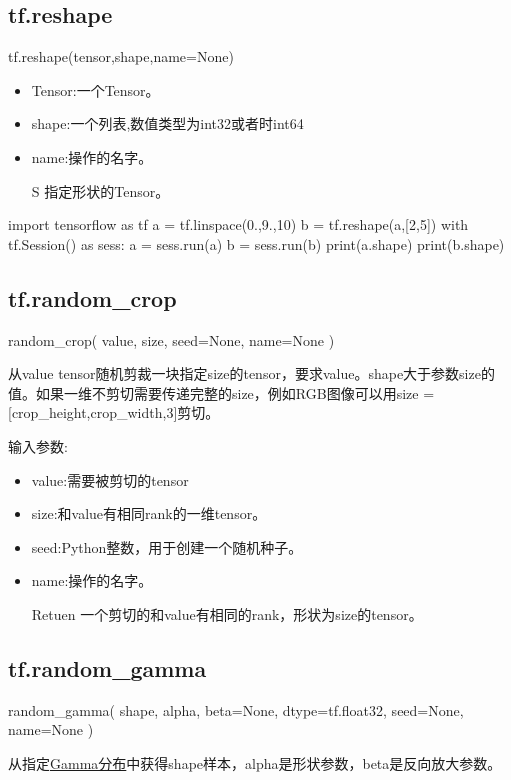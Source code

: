 \subsection{tf.reshape}
tf.reshape(tensor,shape,name=None)
\begin{itemize}
	\item Tensor:一个Tensor。
	\item shape:一个列表,数值类型为int32或者时int64
	\item name:操作的名字。
	\item[S] 指定形状的Tensor。
\end{itemize}
\begin{python}
import tensorflow as tf
a = tf.linspace(0.,9.,10)
b = tf.reshape(a,[2,5])
with tf.Session() as sess:
    a = sess.run(a)
    b = sess.run(b)
print(a.shape)
print(b.shape)
\end{python}
\subsection{tf.random\_crop}
\begin{python}
random_crop(
    value,
    size,
    seed=None,
    name=None
)
\end{python}
从value tensor随机剪裁一块指定size的tensor，要求value。shape大于参数size的值。如果一维不剪切需要传递完整的size，例如RGB图像可以用size = [crop\_height,crop\_width,3]剪切。

输入参数:
\begin{itemize}
\item value:需要被剪切的tensor
\item size:和value有相同rank的一维tensor。
\item seed:Python整数，用于创建一个随机种子。
\item name:操作的名字。
\item[Retuen] 一个剪切的和value有相同的rank，形状为size的tensor。
\end{itemize}
\subsection{tf.random\_gamma}
\begin{python}
random_gamma(
    shape,
    alpha,
    beta=None,
    dtype=tf.float32,
    seed=None,
    name=None
)
\end{python}
从指定\href{https://zh.wikipedia.org/wiki/伽玛分布}{Gamma分布}中获得shape样本，alpha是形状参数，beta是反向放大参数。

